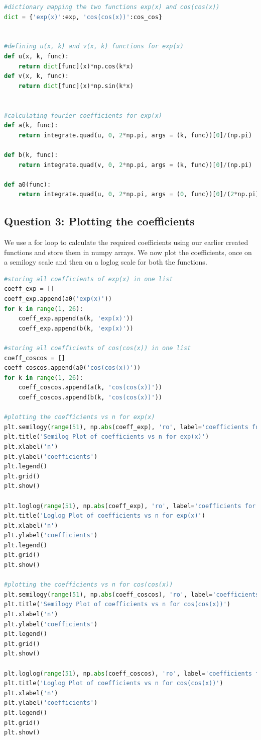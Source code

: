 \documentclass[11pt, a4paper]{article}
\begin{document}
\begin{lstlisting}[language = Python]
#dictionary mapping the two functions exp(x) and cos(cos(x))
dict = {'exp(x)':exp, 'cos(cos(x))':cos_cos}


#defining u(x, k) and v(x, k) functions for exp(x)
def u(x, k, func):
    return dict[func](x)*np.cos(k*x)
def v(x, k, func):
    return dict[func](x)*np.sin(k*x)


#calculating fourier coefficients for exp(x)
def a(k, func):
    return integrate.quad(u, 0, 2*np.pi, args = (k, func))[0]/(np.pi)

def b(k, func):
    return integrate.quad(v, 0, 2*np.pi, args = (k, func))[0]/(np.pi)

def a0(func):
    return integrate.quad(u, 0, 2*np.pi, args = (0, func))[0]/(2*np.pi)
\end{lstlisting}


\subsection{Question 3: Plotting the coefficients}
We use a for loop to calculate the required coefficients using our earlier created functions and store them in numpy arrays. We now plot the coefficients, once on a semilogy scale and then on a loglog scale for both the functions. \\

\begin{lstlisting}[language = Python]
#storing all coefficients of exp(x) in one list
coeff_exp = []
coeff_exp.append(a0('exp(x)'))
for k in range(1, 26):
    coeff_exp.append(a(k, 'exp(x)'))
    coeff_exp.append(b(k, 'exp(x)'))

#storing all coefficients of cos(cos(x)) in one list
coeff_coscos = []
coeff_coscos.append(a0('cos(cos(x))'))
for k in range(1, 26):
    coeff_coscos.append(a(k, 'cos(cos(x))'))
    coeff_coscos.append(b(k, 'cos(cos(x))'))

#plotting the coefficients vs n for exp(x)
plt.semilogy(range(51), np.abs(coeff_exp), 'ro', label='coefficients for exp(x)')
plt.title('Semilog Plot of coefficients vs n for exp(x)')
plt.xlabel('n')
plt.ylabel('coefficients')
plt.legend()
plt.grid()
plt.show()

plt.loglog(range(51), np.abs(coeff_exp), 'ro', label='coefficients for exp(x)')
plt.title('Loglog Plot of coefficients vs n for exp(x)')
plt.xlabel('n')
plt.ylabel('coefficients')
plt.legend()
plt.grid()
plt.show()

#plotting the coefficients vs n for cos(cos(x))
plt.semilogy(range(51), np.abs(coeff_coscos), 'ro', label='coefficients for cos(cos(x))')
plt.title('Semilogy Plot of coefficients vs n for cos(cos(x))')
plt.xlabel('n')
plt.ylabel('coefficients')
plt.legend()
plt.grid()
plt.show()

plt.loglog(range(51), np.abs(coeff_coscos), 'ro', label='coefficients for cos(cos(x))')
plt.title('Loglog Plot of coefficients vs n for cos(cos(x))')
plt.xlabel('n')
plt.ylabel('coefficients')
plt.legend()
plt.grid()
plt.show()

\end{lstlisting}
\end{document}
